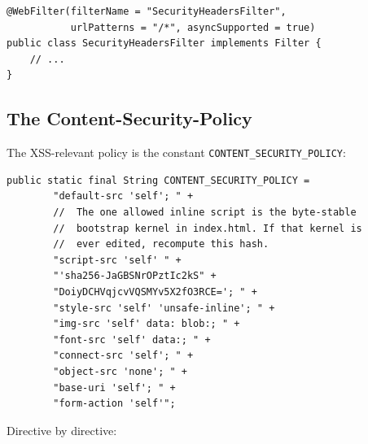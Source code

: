 \begin{lstlisting}[style=java]
@WebFilter(filterName = "SecurityHeadersFilter",
           urlPatterns = "/*", asyncSupported = true)
public class SecurityHeadersFilter implements Filter {
    // ...
}
\end{lstlisting}

\subsection{The Content-Security-Policy}
\label{sec:security-csp}

The XSS-relevant policy is the constant \texttt{CONTENT\_SECURITY\_POLICY}:

\begin{lstlisting}[style=java]
public static final String CONTENT_SECURITY_POLICY =
        "default-src 'self'; " +
        //  The one allowed inline script is the byte-stable
        //  bootstrap kernel in index.html. If that kernel is
        //  ever edited, recompute this hash.
        "script-src 'self' " +
        "'sha256-JaGBSNrOPztIc2kS" +
        "DoiyDCHVqjcvVQSMYv5X2fO3RCE='; " +
        "style-src 'self' 'unsafe-inline'; " +
        "img-src 'self' data: blob:; " +
        "font-src 'self' data:; " +
        "connect-src 'self'; " +
        "object-src 'none'; " +
        "base-uri 'self'; " +
        "form-action 'self'";
\end{lstlisting}

\noindent
Directive by directive:

